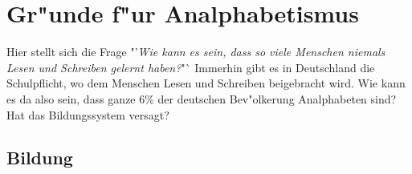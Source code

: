 \section{Gr"unde f"ur Analphabetismus} \label{sec:reasons}

Hier stellt sich die Frage "'\textit{Wie kann es sein, dass so viele Menschen niemals Lesen und Schreiben gelernt haben?}"` Immerhin gibt es in Deutschland die Schulpflicht, wo dem Menschen Lesen und Schreiben beigebracht wird. Wie kann es da also sein, dass ganze 6\% der deutschen Bev"olkerung Analphabeten sind? Hat das Bildungssystem versagt? \\


\subsection{Bildung}

